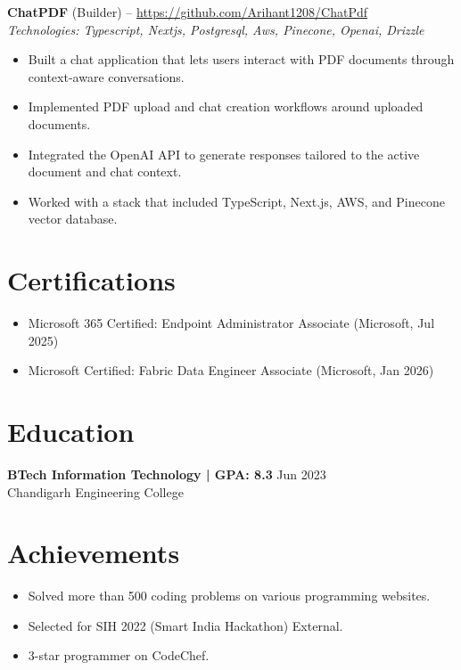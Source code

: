 \documentclass[11pt,a4paper]{article}
\begin{document}
\vspace{2pt}
\textbf{ChatPDF} (Builder) -- \href{https://github.com/Arihant1208/ChatPdf}{https://github.com/Arihant1208/ChatPdf}
\\ \textit{Technologies: Typescript, Nextjs, Postgresql, Aws, Pinecone, Openai, Drizzle}
\begin{itemize}
  \item Built a chat application that lets users interact with PDF documents through context-aware conversations.
  \item Implemented PDF upload and chat creation workflows around uploaded documents.
  \item Integrated the OpenAI API to generate responses tailored to the active document and chat context.
  \item Worked with a stack that included TypeScript, Next.js, AWS, and Pinecone vector database.
\end{itemize}
\vspace{2pt}

\section{Certifications}
\begin{itemize}
  \item Microsoft 365 Certified: Endpoint Administrator Associate (Microsoft, Jul 2025)
  \item Microsoft Certified: Fabric Data Engineer Associate (Microsoft, Jan 2026)
\end{itemize}

\section{Education}
\textbf{BTech Information Technology | GPA: 8.3} \hfill Jun 2023
\\ Chandigarh Engineering College
\vspace{2pt}

\section{Achievements}
\begin{itemize}
  \item Solved more than 500 coding problems on various programming websites.
  \item Selected for SIH 2022 (Smart India Hackathon) External.
  \item 3-star programmer on CodeChef.
\end{itemize}
\end{document}
